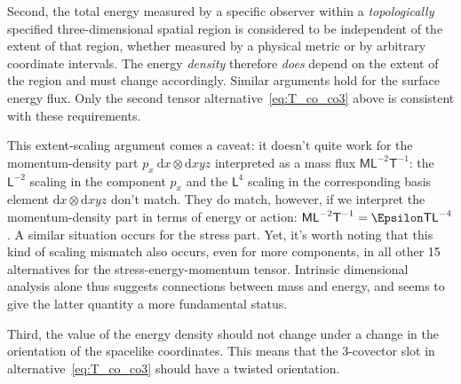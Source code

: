 \documentclass[\ifafour a4paper,12pt,\else a5paper,10pt,\fi%
onecolumn,oneside,article,%
british%
]{memoir}
\theoremstyle{remark}
\theoremstyle{innote}
\newcommand*{\citep}{\footcites}
\newcommand*{\di}{\mathrm{d}}%
\renewcommand*{\|}[1][]{\nonscript\,#1\vert\nonscript\;\mathopen{}}
\newcommand*{\sect}{\S}%
\newcommand*{\cf}{{cf.}}
\newcommand*{\Le}{\textsf{L}}
\newcommand*{\Ti}{\textsf{T}}
\newcommand*{\Ma}{\textsf{M}}
\newcommand*{\En}{\Epsilon}%
\newcommand*{\en}{\epsilon}
\newcommand*{\yp}{p}
\begin{document}
Second, the total energy measured by a specific observer within a
\emph{topologically} specified three-dimensional spatial region is
considered to be independent of the extent of that region, whether measured
by a physical metric or by arbitrary coordinate intervals. %
The energy \emph{density} therefore \emph{does} depend on the extent of the
region and must change accordingly. Similar arguments hold for the surface
energy flux. Only the second tensor alternative~\eqref{eq:T_co_co3} above
is consistent with these requirements.

This extent-scaling argument comes a caveat: it doesn't quite work for the
momentum-density part $\yp_{x}\ \di x\otimes\di xyz$ interpreted as a mass
flux $\Ma\Le^{-2}\Ti^{-1}$: the $\Le^{-2}$ scaling in the component
$\yp_{x}$ and the $\Le^{4}$ scaling in the corresponding basis element
$\di x\otimes\di xyz$ don't match. They do match, however, if we interpret
the momentum-density part in terms of energy or action:
$\Ma\Le^{-2}\Ti^{-1}=\En\Ti\Le^{-4}$. A similar situation occurs for the
stress part. Yet, it's worth noting that this kind of scaling mismatch also
occurs, even for more components, in all other 15 alternatives for the
stress-energy-momentum tensor. Intrinsic dimensional analysis alone thus
suggests connections between mass and energy, and seems to give the latter
quantity a more fundamental status.

Third, the value of the energy density should not change under a change in
the orientation of the spacelike coordinates. This means that the
3-covector slot in alternative~\eqref{eq:T_co_co3} should have a twisted
orientation.
\end{document}
